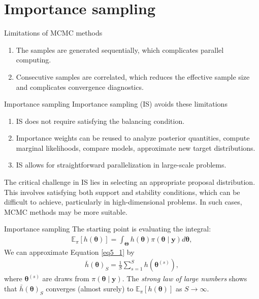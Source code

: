 \documentclass[12pt, compress]{beamer}
\begin{document}
\section{Importance sampling}
\begin{frame}{Limitations of MCMC methods}
	\begin{enumerate}
		\item The samples are generated sequentially, which complicates parallel computing.
		\item Consecutive samples are correlated, which reduces the effective sample size and complicates convergence diagnostics.
	\end{enumerate}
\end{frame}

\begin{frame}{Importance sampling}
	Importance sampling (IS) avoids these limitations
	\begin{enumerate}
		\item IS does not require satisfying the balancing condition.
		\item Importance weights can be reused to analyze posterior quantities, compute marginal likelihoods, compare models, approximate new target distributions.
		\item IS allows for straightforward parallelization in large-scale problems.   
	\end{enumerate}
The critical challenge in IS lies in selecting an appropriate proposal distribution. This involves satisfying both support and stability conditions, which can be difficult to achieve, particularly in high-dimensional problems. In such cases, MCMC methods may be more suitable.
\end{frame}

\begin{frame}{Importance sampling}
The starting point is evaluating the integral:
\begin{align}\label{eq5_1}
	\mathbb{E}_{\pi}[h(\bm{\theta})]=\int_{\bm{\Theta}} h(\bm{\theta}) \pi(\bm{\theta}\mid \bm{y})d\bm{\theta},
\end{align}
We can approximate Equation \ref{eq5_1} by
\begin{align}\label{eq5_2}
	\bar{h}(\bm{\theta})_S=\frac{1}{S}\sum_{s=1}^S h(\bm{\theta}^{(s)}), 
\end{align}
where $\bm{\theta}^{(s)}$ are draws from $\pi(\bm{\theta}\mid \bm{y})$. The \textit{strong law of large numbers} shows that $\bar{h}(\bm{\theta})_S$ converges (almost surely) to $\mathbb{E}_{\pi}[h(\bm{\theta})]$ as $S \rightarrow \infty$.
\end{frame}
\end{document}
